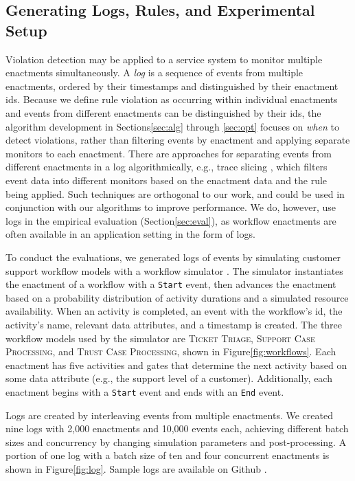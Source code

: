 \subsection{Generating Logs, Rules, and Experimental Setup}
\label{subsec:setup}

Violation detection
may be applied to a service system
to monitor multiple enactments simultaneously.
A {\em log} is a sequence of events from multiple enactments,
ordered by their timestamps
and distinguished by their enactment {\sc id}s.
Because we define rule violation
as occurring within individual enactments
and events from different enactments
can be distinguished by their {\sc id}s,
the algorithm development
in Sections\:\ref{sec:alg} through \ref{sec:opt}
focuses on {\em when} to detect violations,
rather than filtering events by enactment
and applying separate monitors to each enactment.
There are approaches for separating events
from different enactments in a log algorithmically,
e.g., trace slicing \cite{chen2009parametric},
which filters event data into different monitors 
based on the enactment data and the rule being applied.
Such techniques are orthogonal to our work,
and could be used in conjunction with our algorithms
to improve performance.
We do, however, use logs
in the empirical evaluation (Section\:\ref{sec:eval}),
as workflow enactments are often available
in an application setting
in the form of logs.

To conduct the evaluations,
we generated logs of events
by simulating customer support workflow models
with a workflow simulator \cite{Siqueria2020}.
The simulator instantiates the enactment of a workflow
with a \texttt{Start} event,
then advances the enactment
based on a probability distribution of activity durations
and a simulated resource availability.
When an activity is completed,
an event with the workflow's id,
the activity's name, relevant data attributes,
and a timestamp is created.
The three workflow models used by the simulator are
\textsc{Ticket Triage},
\textsc{Support Case Processing}, and
\textsc{Trust Case Processing},
shown in Figure\:\ref{fig:workflows}.
Each enactment has five activities
and gates that determine the next activity
based on some data attribute
(e.g., the support level of a customer).
Additionally, each enactment
begins with a \texttt{Start} event
and ends with an \texttt{End} event.

Logs are created by interleaving events from multiple enactments.
We created nine logs with 2,000 enactments and 10,000 events each,
achieving different batch sizes and concurrency
by changing simulation parameters and post-processing.
A portion of one log with a batch size of ten
and four concurrent enactments
is shown in Figure\:\ref{fig:log}.
Sample logs are available on Github \cite{mackeymultirulemonitor}.

